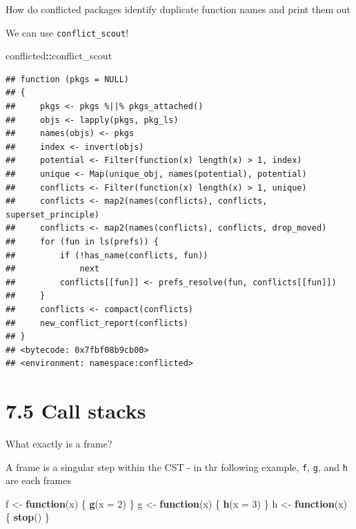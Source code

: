 \documentclass[]{book}
\newenvironment{Shaded}{\begin{snugshade}}{\end{snugshade}}
\newcommand{\ControlFlowTok}[1]{\textcolor[rgb]{0.13,0.29,0.53}{\textbf{#1}}}
\newcommand{\DataTypeTok}[1]{\textcolor[rgb]{0.13,0.29,0.53}{#1}}
\newcommand{\DecValTok}[1]{\textcolor[rgb]{0.00,0.00,0.81}{#1}}
\newcommand{\KeywordTok}[1]{\textcolor[rgb]{0.13,0.29,0.53}{\textbf{#1}}}
\newcommand{\NormalTok}[1]{#1}
\newcommand{\OperatorTok}[1]{\textcolor[rgb]{0.81,0.36,0.00}{\textbf{#1}}}
\newcommand{\StringTok}[1]{\textcolor[rgb]{0.31,0.60,0.02}{#1}}
\begin{document}
How do conflicted packages identify duplicate function names and print them out

We can use \texttt{conflict\_scout}!

\begin{Shaded}
\begin{Highlighting}[]
\NormalTok{conflicted}\OperatorTok{::}\NormalTok{conflict_scout}
\end{Highlighting}
\end{Shaded}

\begin{verbatim}
## function (pkgs = NULL) 
## {
##     pkgs <- pkgs %||% pkgs_attached()
##     objs <- lapply(pkgs, pkg_ls)
##     names(objs) <- pkgs
##     index <- invert(objs)
##     potential <- Filter(function(x) length(x) > 1, index)
##     unique <- Map(unique_obj, names(potential), potential)
##     conflicts <- Filter(function(x) length(x) > 1, unique)
##     conflicts <- map2(names(conflicts), conflicts, superset_principle)
##     conflicts <- map2(names(conflicts), conflicts, drop_moved)
##     for (fun in ls(prefs)) {
##         if (!has_name(conflicts, fun)) 
##             next
##         conflicts[[fun]] <- prefs_resolve(fun, conflicts[[fun]])
##     }
##     conflicts <- compact(conflicts)
##     new_conflict_report(conflicts)
## }
## <bytecode: 0x7fbf08b9cb00>
## <environment: namespace:conflicted>
\end{verbatim}

\hypertarget{call-stacks}{%
\section*{7.5 Call stacks}\label{call-stacks}}

What exactly is a frame?

A frame is a singular step within the CST - in thr following example, \texttt{f}, \texttt{g}, and \texttt{h} are each frames

\begin{Shaded}
\begin{Highlighting}[]
\NormalTok{f <-}\StringTok{ }\ControlFlowTok{function}\NormalTok{(x) \{}
  \KeywordTok{g}\NormalTok{(}\DataTypeTok{x =} \DecValTok{2}\NormalTok{)}
\NormalTok{\}}
\NormalTok{g <-}\StringTok{ }\ControlFlowTok{function}\NormalTok{(x) \{}
  \KeywordTok{h}\NormalTok{(}\DataTypeTok{x =} \DecValTok{3}\NormalTok{)}
\NormalTok{\}}
\NormalTok{h <-}\StringTok{ }\ControlFlowTok{function}\NormalTok{(x) \{}
  \KeywordTok{stop}\NormalTok{()}
\NormalTok{\}}
\end{Highlighting}
\end{Shaded}
\end{document}
